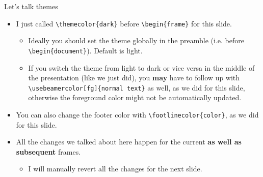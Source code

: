 \documentclass{beamer}
\begin{document}
\begin{frame}[fragile]{Let's talk themes}
\begin{itemize}
\item I just called \verb|\themecolor{dark}| before \verb|\begin{frame}| for this slide.
\begin{itemize}
    \item Ideally you should set the theme globally in the preamble (i.e. before \verb|\begin{document}|). Default is light.
    \item If you switch the theme from light to dark or vice versa in the middle of the presentation (like we just did), you \textbf{may} have to follow up with \verb|\usebeamercolor[fg]{normal text}| as well, as we did for this slide, otherwise the foreground color might not be automatically updated.
\end{itemize}
\item You can also change the footer color with \verb|\footlinecolor{color}|, as we did for this slide.
\item All the changes we talked about here happen for the current \textbf{as well as subsequent} frames.
\begin{itemize}
    \item I will manually revert all the changes for the next slide.
\end{itemize}
\end{itemize}
\end{frame}


\end{document}

